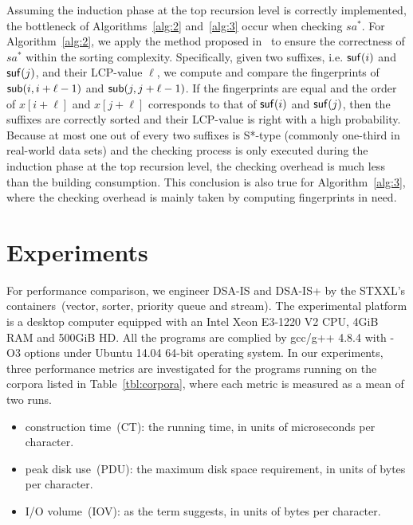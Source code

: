 \documentclass[10pt,journal,compsoc]{IEEEtran}
\begin{document}
Assuming the induction phase at the top recursion level is correctly implemented, the bottleneck of Algorithms~\ref{alg:2} and~\ref{alg:3} occur when checking $sa^*$. For Algorithm~\ref{alg:2}, we apply the method proposed in~\cite{wu2017} to ensure the correctness of $sa^*$ within the sorting complexity. Specifically, given two suffixes, i.e. ${\sf suf}(i)$ and ${\sf suf}(j)$, and their LCP-value $\ell$, we compute and compare the fingerprints of ${\sf sub}(i, i + \ell - 1)$ and ${\sf sub}(j, j + \ell - 1)$. If the fingerprints are equal and the order of $x[i + \ell]$ and $x[j + \ell]$ corresponds to that of ${\sf suf}(i)$ and ${\sf suf}(j)$, then the suffixes are correctly sorted and their LCP-value is right with a high probability. Because at most one out of every two suffixes is S*-type (commonly one-third in real-world data sets) and the checking process is only executed during the induction phase at the top recursion level, the checking overhead is much less than the building consumption. This conclusion is also true for Algorithm~\ref{alg:3}, where the checking overhead is mainly taken by computing fingerprints in need.
 
\section{Experiments} \label{sec:experiments}

For performance comparison, we engineer DSA-IS and DSA-IS+ by the STXXL's containers~(vector, sorter, priority queue and stream). The experimental platform is a desktop computer equipped with an Intel Xeon E3-1220 V2 CPU, 4GiB RAM and 500GiB HD. All the programs are complied by gcc/g++ 4.8.4 with -O3 options under Ubuntu 14.04 64-bit operating system. In our experiments, three performance metrics are investigated for the programs running on the corpora listed in Table~\ref{tbl:corpora}, where each metric is measured as a mean of two runs.

\begin{itemize}
	\item construction time~(CT): the running time, in units of microseconds per character.
	\item peak disk use~(PDU): the maximum disk space requirement, in units of bytes per character.
	\item I/O volume~(IOV): as the term suggests, in units of bytes per character.
\end{itemize}
\end{document}
